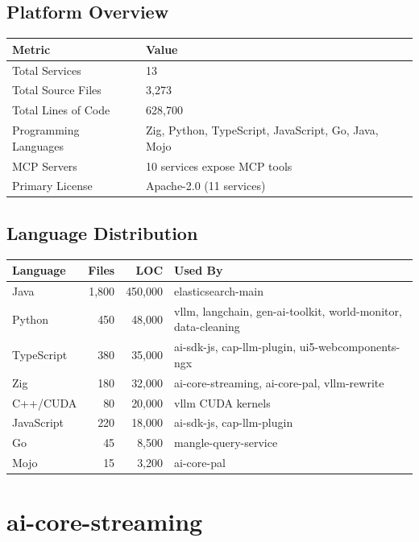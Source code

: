 \documentclass[11pt,a4paper]{article}
\begin{document}
\subsection{Platform Overview}

\begin{tabular}{ll}
\toprule
\textbf{Metric} & \textbf{Value} \\
\midrule
Total Services & 13 \\
Total Source Files & 3,273 \\
Total Lines of Code & 628,700 \\
Programming Languages & Zig, Python, TypeScript, JavaScript, Go, Java, Mojo \\
MCP Servers & 10 services expose MCP tools \\
Primary License & Apache-2.0 (11 services) \\
\bottomrule
\end{tabular}

\subsection{Language Distribution}

\begin{tabular}{lrrL{6cm}}
\toprule
\textbf{Language} & \textbf{Files} & \textbf{LOC} & \textbf{Used By} \\
\midrule
Java & 1,800 & 450,000 & elasticsearch-main \\
Python & 450 & 48,000 & vllm, langchain, gen-ai-toolkit, world-monitor, data-cleaning \\
TypeScript & 380 & 35,000 & ai-sdk-js, cap-llm-plugin, ui5-webcomponents-ngx \\
Zig & 180 & 32,000 & ai-core-streaming, ai-core-pal, vllm-rewrite \\
C++/CUDA & 80 & 20,000 & vllm CUDA kernels \\
JavaScript & 220 & 18,000 & ai-sdk-js, cap-llm-plugin \\
Go & 45 & 8,500 & mangle-query-service \\
Mojo & 15 & 3,200 & ai-core-pal \\
\bottomrule
\end{tabular}

\newpage

\section{ai-core-streaming}
\end{document}
